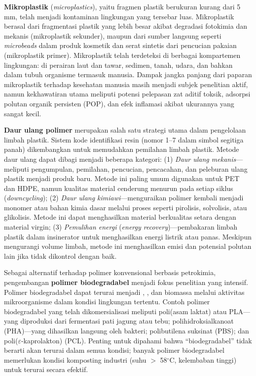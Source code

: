 \documentclass[12pt,a4paper,openany]{book}
\begin{document}
\textbf{Mikroplastik} (\textit{microplastics}), yaitu fragmen plastik berukuran kurang dari 5 mm, telah menjadi kontaminan lingkungan yang tersebar luas. Mikroplastik berasal dari fragmentasi plastik yang lebih besar akibat degradasi fotokimia dan mekanis (mikroplastik sekunder), maupun dari sumber langsung seperti \textit{microbeads} dalam produk kosmetik dan serat sintetis dari pencucian pakaian (mikroplastik primer). Mikroplastik telah terdeteksi di berbagai kompartemen lingkungan: di perairan laut dan tawar, sedimen, tanah, udara, dan bahkan dalam tubuh organisme termasuk manusia. Dampak jangka panjang dari paparan mikroplastik terhadap kesehatan manusia masih menjadi subjek penelitian aktif, namun kekhawatiran utama meliputi potensi pelepasan zat aditif toksik, adsorpsi polutan organik persisten (POP), dan efek inflamasi akibat ukurannya yang sangat kecil.

\textbf{Daur ulang polimer} merupakan salah satu strategi utama dalam pengelolaan limbah plastik. Sistem kode identifikasi resin (nomor 1--7 dalam simbol segitiga panah) dikembangkan untuk memudahkan pemilahan limbah plastik. Metode daur ulang dapat dibagi menjadi beberapa kategori: (1) \textit{Daur ulang mekanis}---meliputi pengumpulan, pemilahan, pencucian, pencacahan, dan peleburan ulang plastik menjadi produk baru. Metode ini paling umum digunakan untuk PET dan HDPE, namun kualitas material cenderung menurun pada setiap siklus (\textit{downcycling}); (2) \textit{Daur ulang kimiawi}---menguraikan polimer kembali menjadi monomer atau bahan kimia dasar melalui proses seperti pirolisis, solvolisis, atau glikolisis. Metode ini dapat menghasilkan material berkualitas setara dengan material virgin; (3) \textit{Pemulihan energi} (\textit{energy recovery})---pembakaran limbah plastik dalam insinerator untuk menghasilkan energi listrik atau panas. Meskipun mengurangi volume limbah, metode ini menghasilkan emisi  dan potensial polutan lain jika tidak dikontrol dengan baik.

Sebagai alternatif terhadap polimer konvensional berbasis petrokimia, pengembangan \textbf{polimer biodegradabel} menjadi fokus penelitian yang intensif. Polimer biodegradabel dapat terurai menjadi , , dan biomassa melalui aktivitas mikroorganisme dalam kondisi lingkungan tertentu. Contoh polimer biodegradabel yang telah dikomersialisasi meliputi poli(asam laktat) atau PLA---yang diproduksi dari fermentasi pati jagung atau tebu; polihidroksialkanoat (PHA)---yang dihasilkan langsung oleh bakteri; polibutilena suksinat (PBS); dan poli($\varepsilon$-kaprolakton) (PCL). Penting untuk dipahami bahwa ``biodegradabel'' tidak berarti akan terurai dalam semua kondisi; banyak polimer biodegradabel memerlukan kondisi komposting industri (suhu $>$ 58$^\circ$C, kelembaban tinggi) untuk terurai secara efektif.
\end{document}
